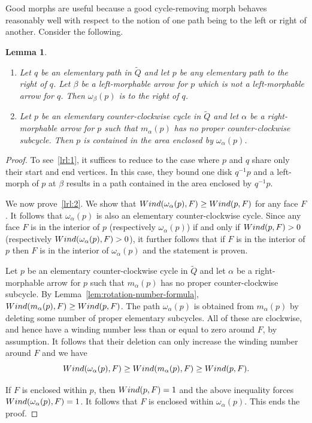 \documentclass{article}
\newtheorem{lemma}[thm]{Lemma}
\theoremstyle{definition}
\newcommand{\wind}{\textup{Wind}}
\begin{document}
Good morphs are useful because a good cycle-removing morph behaves reasonably well with respect to the notion of one path being to the left or right of another.
Consider the following.
\begin{lemma}\label{lem:right-left}
	{ \renewcommand\labelenumi{(\theenumi)}
	\begin{enumerate}
		\item\label{lrl:1} Let $q$ be an elementary path in $\widetilde Q$ and let $p$ be any elementary path to the right of $q$. \label{rlrrl1} Let $\beta$ be a left-morphable arrow for $p$ which is not a left-morphable arrow for $q$. Then $\omega_\beta(p)$ is to the right of $q$.
		\item\label{lrl:2} Let $p$ be an elementary counter-clockwise cycle in $\widetilde Q$ and let $\alpha$ be a right-morphable arrow for $p$ such that $m_\alpha(p)$ has no proper counter-clockwise subcycle. Then $p$ is contained in the area enclosed by $\omega_\alpha(p)$.
	\end{enumerate}}
\end{lemma}
\begin{proof}
	To see~\eqref{lrl:1}, it suffices to reduce to the case where $p$ and $q$ share only their start and end vertices. In this case, they bound one disk $q^{-1}p$ and a 
	left-morph of $p$ at $\beta$ results in a path contained in the area enclosed by $q^{-1}p$.

	We now prove~\eqref{lrl:2}. 
	We show that $\wind(\omega_\alpha(p),F)\geq\wind(p,F)$ for any face $F$. It follows that $\omega_\alpha(p)$ is also an elementary counter-clockwise cycle. Since any face $F$ is in the interior of $p$ (respectively $\omega_\alpha(p)$) if and only if $\wind(p,F)>0$ (respectively $\wind(\omega_\alpha(p),F)>0$), it further follows that if $F$ is in the interior of $p$ then $F$ is in the interior of $\omega_\alpha(p)$ and the statement is proven.

	Let $p$ be an elementary counter-clockwise cycle in $\widetilde Q$ and let $\alpha$ be a right-morphable arrow for $p$ such that $m_\alpha(p)$ has no proper counter-clockwise subcycle. By Lemma~\ref{lem:rotation-number-formula}, $\wind(m_\alpha(p),F)\geq\wind(p,F)$. The path $\omega_\alpha(p)$ is obtained from $m_\alpha(p)$ by deleting some number of proper elementary subcycles. All of these are clockwise, and hence have a winding number less than or equal to zero around $F$, by assumption. It follows that their deletion can only increase the winding number around $F$ and we have
	\[\wind(\omega_\alpha(p),F)\geq\wind(m_\alpha(p),F)\geq\wind(p,F).\]

		If $F$ is enclosed within $p$, then $\wind(p,F)=1$ and the above inequality forces $\wind(\omega_\alpha(p),F)=1$. It follows that $F$ is enclosed within $\omega_\alpha(p)$. This ends the proof.
\end{proof}
\end{document}
